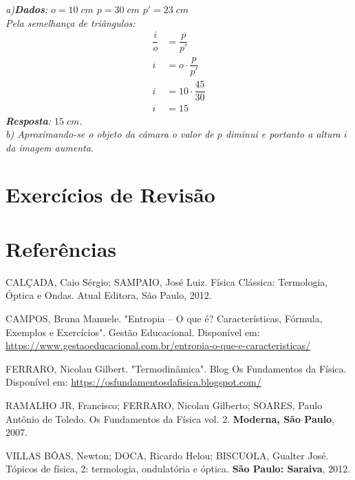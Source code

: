 \documentclass[11pt,twocolumn,oneside]{article}
\newenvironment{resposta*}
  {\bf Resposta:\\ }
  {}
\begin{document}
\begin{resposta*}
{\it a)\textbf{Dados}: $o=10\;cm$ $p=30\;cm$ $p'=23\;cm$ \\
Pela semelhança de triângulos:
\begin{align*}
    \dfrac{i}{o}    &= \dfrac{p}{p'} \\
    i               &= o\cdot \dfrac{p}{p'} \\
    i               &= 10\cdot \dfrac{45}{30} \\
    i               &= 15
\end{align*}
\textbf{Resposta}: $15\;cm$. \\
b) Aproximando-se o objeto da câmara o valor de $p$ diminui e portanto a altura $i$ da imagem aumenta.}
\end{resposta*}

\hypertarget{x-exercícios-de-revisão}{\section{Exercícios de Revisão}}

\hypertarget{x-referências}{\section{Referências}}
CALÇADA, Caio Sérgio; SAMPAIO, José Luiz. Física Clássica: Termologia, Óptica e Ondas. Atual Editora, São Paulo, 2012.


CAMPOS, Bruna Manuele. "Entropia – O que é? Características, Fórmula, Exemplos e Exercícios". Gestão Educacional. Disponível em: \href{https://www.gestaoeducacional.com.br/entropia-o-que-e-caracteristicas/}{https://www.gestaoeducacional.com.br/entropia-o-que-e-caracteristicas/}


FERRARO, Nicolau Gilbert. "Termodinâmica". Blog Os Fundamentos da Física. Disponível em: \href{https://osfundamentosdafisica.blogspot.com/}{https://osfundamentosdafisica.blogspot.com/}


RAMALHO JR, Francisco; FERRARO, Nicolau Gilberto; SOARES, Paulo Antônio de Toledo. Os Fundamentos da Física vol. 2. \textbf{Moderna, São Paulo}, 2007.


VILLAS BÔAS, Newton; DOCA, Ricardo Helou; BISCUOLA, Gualter José. Tópicos de física, 2: termologia, ondulatória e óptica. \textbf{São Paulo: Saraiva}, 2012.
\end{document}
